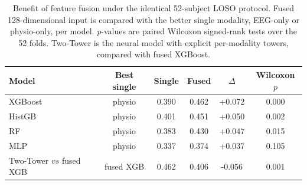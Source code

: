 \begin{table}[t]
\centering
\small
\caption{Benefit of feature fusion under the identical 52-subject LOSO protocol.
Fused 128-dimensional input is compared with the better single modality, EEG-only or
physio-only, per model. \emph{p}-values are paired Wilcoxon signed-rank tests over
the 52 folds. Two-Tower is the neural model with explicit per-modality towers,
compared with fused XGBoost.}
\label{tab:ablation}
\begin{tabular}{lccccc}
\toprule
Model & Best single & Single & Fused & $\Delta$ & Wilcoxon $p$ \\
\midrule
XGBoost & physio & 0.390 & 0.462 & +0.072 & 0.000 \\
HistGB & physio & 0.401 & 0.451 & +0.050 & 0.002 \\
RF & physio & 0.383 & 0.430 & +0.047 & 0.015 \\
MLP & physio & 0.337 & 0.374 & +0.037 & 0.105 \\
Two-Tower $vs$ fused XGB & fused XGB & 0.462 & 0.406 & -0.056 & 0.001 \\
\bottomrule
\end{tabular}
\end{table}
